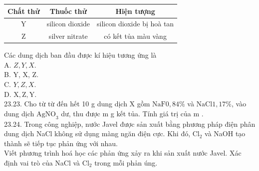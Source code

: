 \documentclass[10pt]{article}
\begin{document}
\begin{center}
\begin{tabular}{|c|c|c|}
\hline
Chất thử & Thuốc thử & Hiện tượng \\
\hline
Y & silicon dioxide & silicon dioxide bị hoà tan \\
\hline
Z & silver nitrate & có kết tủa màu vàng \\
\hline
\end{tabular}
\end{center}

Các dung dịch ban đầu được kí hiệu tương ứng là\\
A. $Z, Y, X$.\\
B. Y, X, Z.\\
C. $Y, Z, X$.\\
D. $\mathrm{X}, \mathrm{Z}, \mathrm{Y}$.\\
23.23. Cho từ từ đến hết 10 g dung dịch X gồm $\mathrm{NaF} 0,84 \%$ và $\mathrm{NaCl} 1,17 \%$, vào dung dịch $\mathrm{AgNO}_{3}$ dư, thu được m g kết tủa. Tính giá trị của m .\\
23.24. Trong công nghiệp, nước Javel được sản xuất bằng phương pháp điện phân dung dịch NaCl không sử dụng màng ngăn điện cực. Khi đó, $\mathrm{Cl}_{2}$ và NaOH tạo thành sẽ tiếp tục phản ứng với nhau.\\
Viết phương trình hoá học các phản ứng xảy ra khi sản xuất nước Javel. Xác định vai trò của NaCl và $\mathrm{Cl}_{2}$ trong mỗi phản úng.
\end{document}
